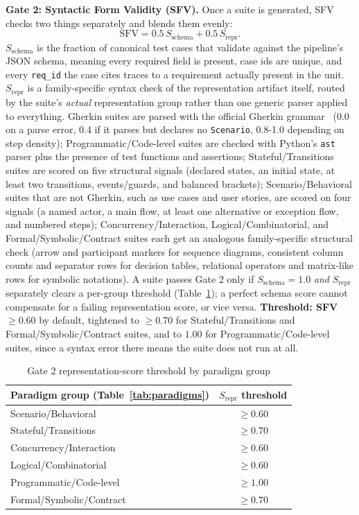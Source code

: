 \documentclass[conference]{IEEEtran}
\begin{document}
\textbf{Gate 2: Syntactic Form Validity (SFV).} Once a suite is generated,
SFV checks two things separately and blends them evenly:
\begin{equation}
\mathrm{SFV} = 0.5\,S_{\text{schema}} + 0.5\,S_{\text{repr}}.
\end{equation}
$S_{\text{schema}}$ is the fraction of canonical test cases that validate
against the pipeline's JSON schema, meaning every required field is
present, case ids are unique, and every \texttt{req\_id} the case cites
traces to a requirement actually present in the unit. $S_{\text{repr}}$ is
a family-specific syntax check of the representation artifact itself,
routed by the suite's \emph{actual} representation group rather than one
generic parser applied to everything. Gherkin suites are parsed with the
official Gherkin grammar~\cite{wynne2012cucumber} (0.0 on a parse error, 0.4 if it parses but
declares no \texttt{Scenario}, 0.8-1.0 depending on step density);
Programmatic/Code-level suites are checked with Python's \texttt{ast}
parser plus the presence of test functions and assertions;
Stateful/Transitions suites are scored on five structural signals
(declared states, an initial state, at least two transitions,
events/guards, and balanced brackets); Scenario/Behavioral suites that are
not Gherkin, such as use cases and user stories, are scored on four
signals (a named actor, a main flow, at least one alternative or
exception flow, and numbered steps); Concurrency/Interaction,
Logical/Combinatorial, and Formal/Symbolic/Contract suites each get an
analogous family-specific structural check (arrow and participant markers
for sequence diagrams, consistent column counts and separator rows for
decision tables, relational operators and matrix-like rows for symbolic
notations). A suite passes Gate 2 only if $S_{\text{schema}} = 1.0$
\emph{and} $S_{\text{repr}}$ separately clears a per-group threshold
(Table~\ref{tab:sfvthresh}); a perfect schema score cannot compensate for
a failing representation score, or vice versa. \textbf{Threshold: SFV
$\geq 0.60$} by default, tightened to $\geq 0.70$ for
Stateful/Transitions and Formal/Symbolic/Contract suites, and to $1.00$
for Programmatic/Code-level suites, since a syntax error there means the
suite does not run at all.

\begin{table}[t]
\centering
\caption{Gate 2 representation-score threshold by paradigm group}
\label{tab:sfvthresh}
\small
\begin{tabular}{@{}lc@{}}
\toprule
\textbf{Paradigm group (Table~\ref{tab:paradigms})} & \textbf{$S_{\text{repr}}$ threshold} \\
\midrule
Scenario/Behavioral & $\geq 0.60$ \\
Stateful/Transitions & $\geq 0.70$ \\
Concurrency/Interaction & $\geq 0.60$ \\
Logical/Combinatorial & $\geq 0.60$ \\
Programmatic/Code-level & $\geq 1.00$ \\
Formal/Symbolic/Contract & $\geq 0.70$ \\
\bottomrule
\end{tabular}
\end{table}
\end{document}
